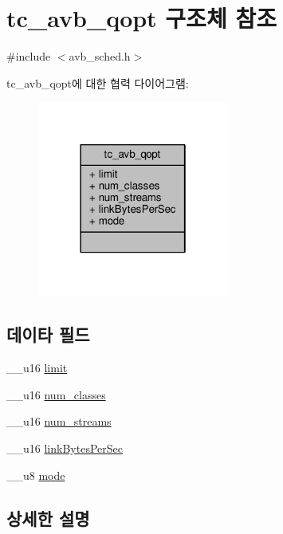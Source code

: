 \hypertarget{structtc__avb__qopt}{}\section{tc\+\_\+avb\+\_\+qopt 구조체 참조}
\label{structtc__avb__qopt}


{\ttfamily \#include $<$avb\+\_\+sched.\+h$>$}



tc\+\_\+avb\+\_\+qopt에 대한 협력 다이어그램\+:
\nopagebreak
\begin{figure}[H]
\begin{center}
\leavevmode
\includegraphics[width=178pt]{structtc__avb__qopt__coll__graph}
\end{center}
\end{figure}
\subsection*{데이타 필드}
\begin{DoxyCompactItemize}
\item 
\+\_\+\+\_\+u16 \hyperlink{structtc__avb__qopt_a7e8fb1e66756150a9657fd6724d57fe6}{limit}
\item 
\+\_\+\+\_\+u16 \hyperlink{structtc__avb__qopt_afe0162ad6ffb28468a07237911cf16e5}{num\+\_\+classes}
\item 
\+\_\+\+\_\+u16 \hyperlink{structtc__avb__qopt_a003afbc4ed1d684d12bd6ac993b953f4}{num\+\_\+streams}
\item 
\+\_\+\+\_\+u16 \hyperlink{structtc__avb__qopt_a4f0a21b15ac402ff1f0d52d9ed33057e}{link\+Bytes\+Per\+Sec}
\item 
\+\_\+\+\_\+u8 \hyperlink{structtc__avb__qopt_a10043a7b4ed103bf3f7400423cd3ee38}{mode}
\end{DoxyCompactItemize}


\subsection{상세한 설명}


